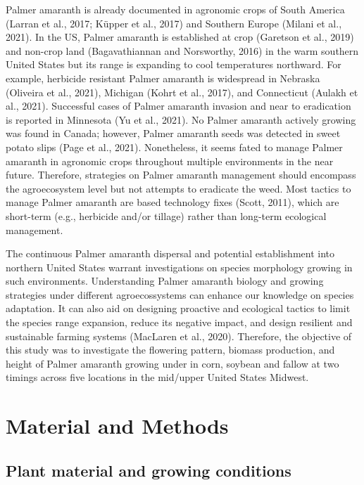 \documentclass[utf8]{frontiersSCNS}
\begin{document}
Palmer amaranth is already documented in agronomic crops of South
America (Larran et al., 2017; Küpper et al., 2017) and Southern Europe
(Milani et al., 2021). In the US, Palmer amaranth is established at crop
(Garetson et al., 2019) and non-crop land (Bagavathiannan and
Norsworthy, 2016) in the warm southern United States but its range is
expanding to cool temperatures northward. For example, herbicide
resistant Palmer amaranth is widespread in Nebraska (Oliveira et al.,
2021), Michigan (Kohrt et al., 2017), and Connecticut (Aulakh et al.,
2021). Successful cases of Palmer amaranth invasion and near to
eradication is reported in Minnesota (Yu et al., 2021). No Palmer
amaranth actively growing was found in Canada; however, Palmer amaranth
seeds was detected in sweet potato slips (Page et al., 2021).
Nonetheless, it seems fated to manage Palmer amaranth in agronomic crops
throughout multiple environments in the near future. Therefore,
strategies on Palmer amaranth management should encompass the
agroecosystem level but not attempts to eradicate the weed. Most tactics
to manage Palmer amaranth are based technology fixes (Scott, 2011),
which are short-term (e.g., herbicide and/or tillage) rather than
long-term ecological management.

The continuous Palmer amaranth dispersal and potential establishment
into northern United States warrant investigations on species morphology
growing in such environments. Understanding Palmer amaranth biology and
growing strategies under different agroecossystems can enhance our
knowledge on species adaptation. It can also aid on designing proactive
and ecological tactics to limit the species range expansion, reduce its
negative impact, and design resilient and sustainable farming systems
(MacLaren et al., 2020). Therefore, the objective of this study was to
investigate the flowering pattern, biomass production, and height of
Palmer amaranth growing under in corn, soybean and fallow at two timings
across five locations in the mid/upper United States Midwest.

\hypertarget{material-and-methods}{%
\section*{Material and Methods}\label{material-and-methods}}

\hypertarget{plant-material-and-growing-conditions}{%
\subsection*{Plant material and growing
conditions}\label{plant-material-and-growing-conditions}}
\end{document}
